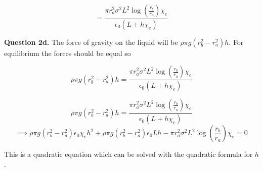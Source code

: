 \documentclass[letterpaper, reqno,11pt]{article}
\begin{document}
$$
    =\frac{\pi r_a^2\sigma^2L^2\log(\frac{r_b}{r_a})\chi_e}{\epsilon_0(L+h\chi_e)}
$$

{\noindent\bf Question 2d.} The force of gravity on the liquid will be $\rho\pi g(r_b^2-r_a^2)h$. For equilibrium the forces should be equal so 

$$
    \rho\pi g(r_b^2-r_a^2)h=\frac{\pi r_a^2\sigma^2L^2\log(\frac{r_b}{r_a})\chi_e}{\epsilon_0(L+h\chi_e)}
$$

$$
    \rho\pi g(r_b^2-r_a^2)h=\frac{\pi r_a^2\sigma^2L^2\log(\frac{r_b}{r_a})\chi_e}{\epsilon_0(L+h\chi_e)}
$$
$$
    \implies\rho\pi g(r_b^2-r_a^2)\epsilon_0\chi_e h^2+\rho\pi g(r_b^2-r_a^2)\epsilon_0Lh-\pi r_a^2\sigma^2L^2\log(\frac{r_b}{r_a})\chi_e=0
$$

This is a quadratic equation which can be solved with the quadratic formula for $h$. 
\end{document}
